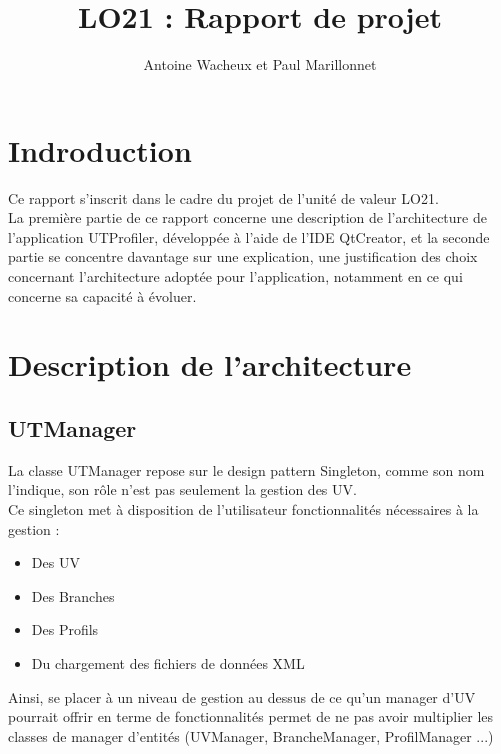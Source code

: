 \documentclass[a4paper,10pt,french]{report}
\begin{document}
\author{Antoine Wacheux et Paul Marillonnet}
\title{LO21 : Rapport de projet}\maketitle

\tableofcontents
\newpage



\section*{Indroduction}\label{sec:Introduction}

Ce rapport s'inscrit dans le cadre du projet de l'unité de valeur LO21.\\
La première partie de ce rapport concerne une description de l'architecture de l'application UTProfiler, développée à l'aide de l'IDE QtCreator, et la seconde partie se concentre davantage sur une explication, une justification des choix concernant l'architecture adoptée pour l'application, notamment en ce qui concerne sa capacité à évoluer.

\newpage
\section{Description de l'architecture}\label{sec:I}



	\subsection{UTManager}\label{subsec:UTManager}
	
	La classe UTManager repose sur le design pattern Singleton, comme son nom l'indique, son rôle n'est pas seulement la gestion des UV. \\
	Ce singleton met à disposition de l'utilisateur fonctionnalités nécessaires à la gestion :
	\begin{itemize}
	\item Des UV
	\item Des Branches
	\item Des Profils
	\item Du chargement des fichiers de données XML	
	\end{itemize}
	Ainsi, se placer à un niveau de gestion au dessus de ce qu'un manager d'UV pourrait offrir en terme de fonctionnalités permet de ne pas avoir multiplier les classes de manager d'entités (UVManager, BrancheManager, ProfilManager ...)
\end{document}
